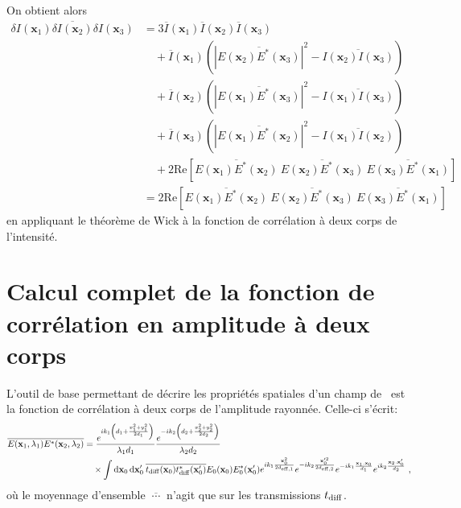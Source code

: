 On obtient alors 
\begin{align}
\overline{\delta I(\mathbf{x}_1) \delta I(\mathbf{x}_2) \delta I(\mathbf{x}_3)} &= 3 \overline{I}(\mathbf{x}_1) \overline{I}(\mathbf{x}_2) \overline{I}(\mathbf{x}_3)\\
\nonumber & \quad + \overline{I}(\mathbf{x}_1) \left( \left|\overline{E(\mathbf{x}_2)E^*(\mathbf{x}_3)} \right|^2 -\overline{I(\mathbf{x}_2)I(\mathbf{x}_3)}\right) \\
\nonumber & \quad + \overline{I}(\mathbf{x}_2) \left( \left|\overline{E(\mathbf{x}_1)E^*(\mathbf{x}_3)}\right|^2 - \overline{I(\mathbf{x}_1)I(\mathbf{x}_3)}\right)\\
\nonumber & \quad + \overline{I}(\mathbf{x}_3) \left(\left|\overline{E(\mathbf{x}_1)E^*(\mathbf{x}_2)}\right|^2 -\overline{I(\mathbf{x}_1)I(\mathbf{x}_2)}\right)\\
\nonumber & \quad + 2\mathrm{Re}\left[ \overline{E(\mathbf{x}_1)E^*(\mathbf{x}_2)} \: \overline{E(\mathbf{x}_2)E^*(\mathbf{x}_3)} \: \overline{E(\mathbf{x}_3)E^*(\mathbf{x}_1)}\right] \\
&= 2\mathrm{Re}\left[ \overline{E(\mathbf{x}_1)E^*(\mathbf{x}_2)} \: \overline{E(\mathbf{x}_2)E^*(\mathbf{x}_3)} \: \overline{E(\mathbf{x}_3)E^*(\mathbf{x}_1)}\right]
\label{eq:wick_3corps}
\end{align}
en appliquant le théorème de Wick à la fonction de corrélation à deux corps de l'intensité.





\section{Calcul complet de la fonction de corrélation en amplitude à deux corps}
L'outil de base permettant de décrire les propriétés spatiales d'un champ de \speckle\ est la fonction de corrélation à deux corps de l'amplitude rayonnée. Celle-ci s'écrit:
\begin{align}
\overline{E(\mathbf{x}_1,\lambda_1)E^*(\mathbf{x}_2,\lambda_2)} &= \frac{e^{ik_1 \left( d_1+\frac{x_1^2+y_1^2}{2d_1} \right)}}{\lambda_1 d_1} \frac{e^{-i k_2 \left( d_2+ \frac{x_2^2+y_2^2}{2d_2} \right)}}{\lambda_2 d_2} \\
\nonumber & \quad \times \int{\mathop{}\mathopen{}\mathrm{d}\mathbf{x}_0\mathop{}\mathopen{}\mathrm{d}\mathbf{x}_0' \: \overline{t_{\mathrm{diff}}(\mathbf{x}_0)t_{\mathrm{diff}}^*(\mathbf{x}_0')} E_0(\mathbf{x}_0) E_0^*(\mathbf{x}_0') e^{ik_1\frac{ \mathbf{x}_0^2}{2d_{\mathrm{eff,1}}}} e^{-ik_2\frac{ \mathbf{x}_0'^2}{2d_{\mathrm{eff,2}}}} e^{-ik_1 \frac{\mathbf{x}_1 . \mathbf{x}_0}{d_1}} e^{ik_2 \frac{\mathbf{x}_2 . \mathbf{x}_0'}{d_2}}} \text{ ,}
\end{align}
où le moyennage d'ensemble $\overline{\:\cdots\:}$ n'agit que sur les transmissions $t_{\mathrm{diff}}$.

